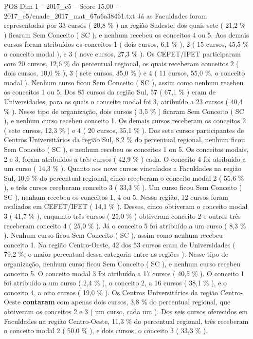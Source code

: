 \begin{textsample}{POS Dim 1 – 2017\_c5 – Score 15.00 – 2017\_c5/enade\_2017\_mat\_67a6a38461.txt}
Já as Faculdades foram representadas por 33 cursos ( 20,8 \% ) na região Sudeste, dos quais sete ( 21,2 \% ) ficaram Sem Conceito ( SC ), e nenhum recebeu os conceitos 4 ou 5.
Aos demais cursos foram atribuídos os conceitos 1 ( dois cursos, 6,1 \% ), 2 ( 15 cursos, 45,5 \% o conceito modal ), e 3 ( nove cursos, 27,3 \% ).
Os CEFET/IFET participaram com 20 cursos, 12,6 \% do percentual regional, os quais receberam conceitos 2 ( dois cursos, 10,0 \% ), 3 ( sete cursos, 35,0 \% ) e 4 ( 11 cursos, 55,0 \%, o conceito modal ).
Nenhum curso ficou Sem Conceito ( SC ), assim como nenhum recebeu os conceitos 1 ou 5.
Dos 85 cursos da região Sul, 57 ( 67,1 \% ) eram de Universidades, para os quais o conceito modal foi 3, atribuído a 23 cursos ( 40,4 \% ).
Nesse tipo de organização, dois cursos ( 3,5 \% ) ficaram Sem Conceito ( SC ), e nenhum curso recebeu conceito 1.
Os demais cursos receberam os conceitos 2 ( sete cursos, 12,3 \% ) e 4 ( 20 cursos, 35,1 \% ).
Dos sete cursos participantes de Centros Universitários da região Sul, 8,2 \% do percentual regional, nenhum ficou Sem Conceito ( SC ), e nenhum recebeu os conceitos 1 ou 5.
Os conceitos modais, 2 e 3, foram atribuídos a três cursos ( 42,9 \% ) cada.
O conceito 4 foi atribuído a um curso ( 14,3 \% ).
Quanto aos nove cursos vinculados a Faculdades na região Sul, 10,6 \% do percentual regional, cinco receberam o conceito modal 2 ( 55,6 \% ), e três cursos receberam conceito 3 ( 33,3 \% ).
Um curso ficou Sem Conceito ( SC ), nenhum recebeu os conceitos 1, 4 ou 5.
Nessa região, 12 cursos foram avaliados em CEFET/IFET ( 14,1 \% ).
Desses, cinco obtiveram o conceito modal 3 ( 41,7 \% ), enquanto três cursos ( 25,0 \% ) obtiveram conceito 2 e outros três receberam conceito 4 ( 25,0 \% ).
Já o conceito 5 foi atribuído a um curso ( 8,3 \% ).
Nenhum curso ficou Sem Conceito ( SC ), assim como nenhum recebeu conceito 1.
Na região Centro-Oeste, 42 dos 53 cursos eram de Universidades ( 79,2 \%, o maior percentual dessa categoria entre as regiões ).
Nesse tipo de organização, nenhum curso ficou Sem Conceito ( SC ), e nenhum curso recebeu conceito 5.
O conceito modal 3 foi atribuído a 17 cursos ( 40,5 \% ).
O conceito 1 foi atribuído a um curso ( 2,4 \% ), o conceito 2, a 16 cursos ( 38,1 \% ), e o conceito 4, a oito cursos ( 19,0 \% ).
Os Centros Universitários da região Centro-Oeste \textbf{contaram} com apenas dois cursos, 3,8 \% do percentual regional, que obtiveram os conceitos 2 e 3 ( um curso, cada um ).
Dos seis cursos oferecidos em Faculdades na região Centro-Oeste, 11,3 \% do percentual regional, três receberam o conceito modal 2 ( 50,0 \% ), e dois cursos, o conceito 3 ( 33,3 \% ).

\end{textsample}
